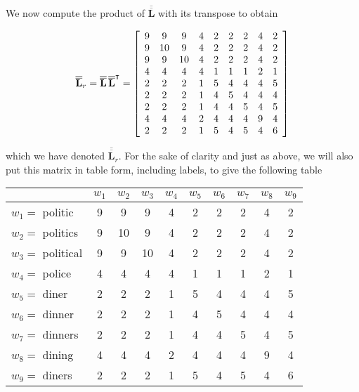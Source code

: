 \documentclass{article}[12pt]
\newcommand{\mat}[1]{\overline{\overline{\mathbf{#1}}}}
\begin{document}
\begin{flushleft}
We now compute the product of $\mat{L}$ with its transpose to obtain 

\begin{align}
\mat{L}_r = \mat{L} \, \mat{L}^\intercal = \left[ 
	\begin{array}{c c c c c c c c c}
		9 & 9 & 9 & 4 & 2 & 2 & 2 & 4 & 2 \\
		9 & 10 & 9 & 4 & 2 & 2 & 2 & 4 & 2 \\
		9 & 9 & 10 & 4 & 2 & 2 & 2 & 4 & 2 \\
		4 & 4 & 4 & 4 & 1 & 1 & 1 & 2 & 1 \\
		2 & 2 & 2 & 1 & 5 & 4 & 4 & 4 & 5 \\
		2 & 2 & 2 & 1 & 4 & 5 & 4 & 4 & 4 \\
		2 & 2 & 2 & 1 & 4 & 4 & 5 & 4 & 5 \\
		4 & 4 & 4 & 2 & 4 & 4 & 4 & 9 & 4 \\
		2 & 2 & 2 & 1 & 5 & 4 & 5 & 4 & 6
		\end{array} \right]
\end{align}

which we have denoted $\mat{L}_r$.  For the sake of clarity and just as above, we will also put this matrix in table form, including labels, to give the following table

\end{flushleft} \begin{center}
\begin{tabular}{l || c c c c c c c c c}
	& $w_1$ & $w_2$ & $w_3$ & $w_4$ & $w_5$ & $w_6$ & $w_7$ & $w_8$ & $w_9$  \\
	\hline
	$w_1 =$ politic & 9 & 9 & 9 & 4 & 2 & 2 & 2 & 4 & 2 \\
	$w_2 =$ politics & 9 & 10 & 9 & 4 & 2 & 2 & 2 & 4 & 2 \\
	$w_3 =$ political & 9 & 9 & 10 & 4 & 2 & 2 & 2 & 4 & 2 \\
	$w_4 =$ police & 4 & 4 & 4 & 4 & 1 & 1 & 1 & 2 & 1 \\
	$w_5 =$ diner & 2 & 2 & 2 & 1 & 5 & 4 & 4 & 4 & 5 \\
	$w_6 =$ dinner & 2 & 2 & 2 & 1 & 4 & 5 & 4 & 4 & 4 \\
	$w_7 =$ dinners & 2 & 2 & 2 & 1 & 4 & 4 & 5 & 4 & 5 \\
	$w_8 =$ dining & 4 & 4 & 4 & 2 & 4 & 4 & 4 & 9 & 4 \\
	$w_9 =$ diners & 2 & 2 & 2 & 1 & 5 & 4 & 5 & 4 & 6
\end{tabular} \newline
\end{center} \begin{flushleft}


\end{flushleft}
\end{document}
